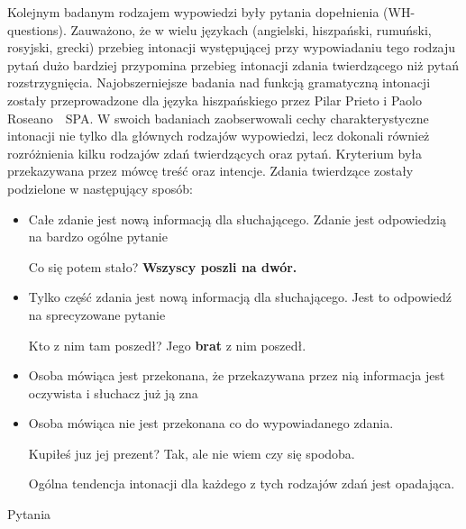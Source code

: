 \documentclass[a4paper,12 pt]{report}
\begin{document}
Kolejnym badanym rodzajem wypowiedzi były pytania dopełnienia (WH-questions). Zauważono, że w wielu językach (angielski, hiszpański, rumuński, rosyjski, grecki) przebieg intonacji występującej przy wypowiadaniu tego rodzaju pytań dużo bardziej przypomina przebieg intonacji zdania twierdzącego niż pytań rozstrzygnięcia.
\newline
\newline
Najobszerniejsze badania nad funkcją gramatyczną intonacji zostały przeprowadzone dla języka hiszpańskiego przez Pilar Prieto i Paolo Roseano~\
{SPA}. W swoich badaniach zaobserwowali cechy charakterystyczne intonacji nie tylko dla głównych rodzajów wypowiedzi, lecz dokonali również rozróżnienia kilku rodzajów zdań twierdzących oraz pytań. Kryterium była przekazywana przez mówcę treść oraz intencje.
\newline
Zdania twierdzące zostały podzielone w następujący sposób:
\begin{itemize}
\item{Całe zdanie jest nową informacją dla słuchającego. Zdanie jest odpowiedzią na bardzo ogólne pytanie}
\begin{exe}
\ex Co się potem stało?
\newline
\textbf{Wszyscy poszli na dwór.}
\end{exe}
\item{Tylko część zdania jest nową informacją dla słuchającego. Jest to odpowiedź na sprecyzowane pytanie}
\begin{exe}
\ex Kto z nim tam poszedł?
\newline
Jego \textbf{brat} z nim poszedł.
\end{exe}

\item{Osoba mówiąca jest przekonana, że przekazywana przez nią informacja jest oczywista i słuchacz już ją zna}
\item{Osoba mówiąca nie jest przekonana co do wypowiadanego zdania.}
\begin{exe}
\ex Kupiłeś juz jej prezent?
\newline
Tak, ale nie wiem czy się spodoba.
\end{exe}
Ogólna tendencja intonacji dla każdego z tych rodzajów zdań jest opadająca.
\end{itemize}
Pytania
\end{document}
